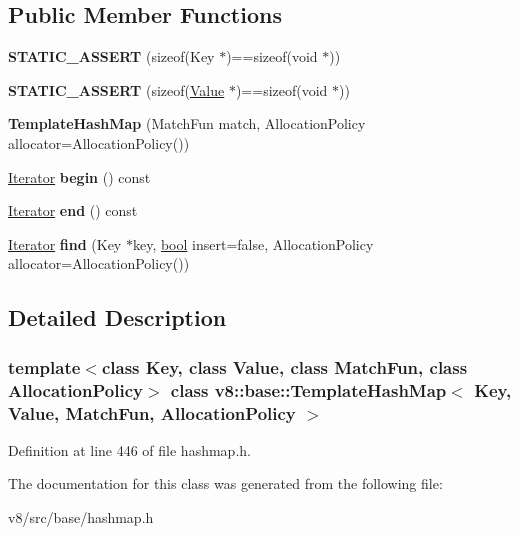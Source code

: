 \subsection*{Public Member Functions}
\begin{DoxyCompactItemize}
\item 
\mbox{\label{classv8_1_1base_1_1TemplateHashMap_ae1a0e9ab14cfacdbdb920ca5a70bf6ac}} 
{\bfseries S\+T\+A\+T\+I\+C\+\_\+\+A\+S\+S\+E\+RT} (sizeof(Key $\ast$)==sizeof(void $\ast$))
\item 
\mbox{\label{classv8_1_1base_1_1TemplateHashMap_ac16b8058f9b0f694b99e5cad1205e845}} 
{\bfseries S\+T\+A\+T\+I\+C\+\_\+\+A\+S\+S\+E\+RT} (sizeof(\mbox{\hyperlink{classv8_1_1Value}{Value}} $\ast$)==sizeof(void $\ast$))
\item 
\mbox{\label{classv8_1_1base_1_1TemplateHashMap_a47543cd71644f259d734b3371d85148a}} 
{\bfseries Template\+Hash\+Map} (Match\+Fun match, Allocation\+Policy allocator=Allocation\+Policy())
\item 
\mbox{\label{classv8_1_1base_1_1TemplateHashMap_a80bea100951cd277f63fb82d28e92ec0}} 
\mbox{\hyperlink{classv8_1_1base_1_1TemplateHashMap_1_1Iterator}{Iterator}} {\bfseries begin} () const
\item 
\mbox{\label{classv8_1_1base_1_1TemplateHashMap_ae4bb1d5cfaf31bb95797e2a157ddb553}} 
\mbox{\hyperlink{classv8_1_1base_1_1TemplateHashMap_1_1Iterator}{Iterator}} {\bfseries end} () const
\item 
\mbox{\label{classv8_1_1base_1_1TemplateHashMap_a8bff856be9e74c5ecda26cc80005d66c}} 
\mbox{\hyperlink{classv8_1_1base_1_1TemplateHashMap_1_1Iterator}{Iterator}} {\bfseries find} (Key $\ast$key, \mbox{\hyperlink{classbool}{bool}} insert=false, Allocation\+Policy allocator=Allocation\+Policy())
\end{DoxyCompactItemize}


\subsection{Detailed Description}
\subsubsection*{template$<$class Key, class Value, class Match\+Fun, class Allocation\+Policy$>$\newline
class v8\+::base\+::\+Template\+Hash\+Map$<$ Key, Value, Match\+Fun, Allocation\+Policy $>$}



Definition at line 446 of file hashmap.\+h.



The documentation for this class was generated from the following file\+:\begin{DoxyCompactItemize}
\item 
v8/src/base/hashmap.\+h\end{DoxyCompactItemize}
